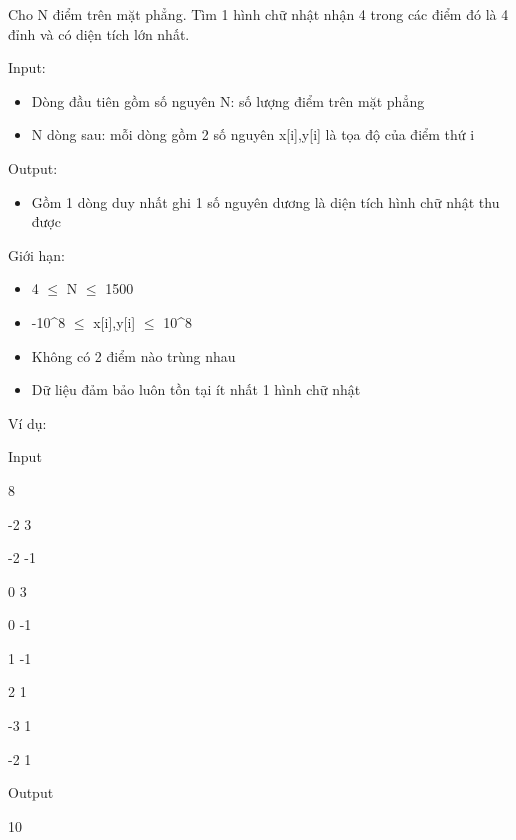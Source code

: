 



    Cho N điểm trên mặt phẳng. Tìm 1 hình chữ nhật nhận 4 trong các điểm đó là 4 đỉnh và có diện tích lớn nhất.   

    Input:   
\begin{itemize}
	\item 

      Dòng  đầu tiên gồm số nguyên N: số lượng điểm trên mặt  phẳng     
	\item 

      N  dòng sau: mỗi dòng gồm 2 số nguyên x[i],y[i] là tọa độ  của điểm thứ i     
\end{itemize}

    Output:   
\begin{itemize}
	\item 

      Gồm  1 dòng duy nhất ghi 1 số nguyên dương là diện tích hình  chữ nhật thu được     
\end{itemize}



    Giới hạn:   
\begin{itemize}
	\item 

      4   $\le$  N  $\le$  1500     
	\item 

      -10\textasciicircum8   $\le$  x[i],y[i]  $\le$  10\textasciicircum8     
	\item 

      Không  có 2 điểm nào trùng nhau     
	\item 

      Dữ  liệu đảm bảo luôn tồn tại ít nhất 1 hình chữ nhật     
\end{itemize}



    Ví dụ:   

        Input       

        8       

        -2 3       

        -2 -1       

        0 3       

        0 -1       

        1 -1       

        2 1       

        -3 1       

        -2 1       

        Output       

        10       
